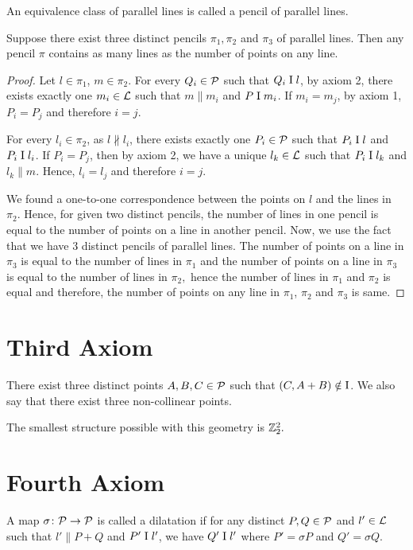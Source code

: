 \noindent
An equivalence class of parallel lines is called a pencil of parallel lines.

\begin{theorem} \label{thm:lines_num_pts}
    Suppose there exist three distinct pencils $\pi_1, \pi_2$ and $\pi_3$ of parallel lines. Then any pencil $\pi$ contains as many lines as the number of points on any line.
\end{theorem}
\begin{proof}
    Let $l \in \pi_1$, $m \in \pi_2$. For every $Q_i \in \mathcal{P}$ such that $Q_i \mathrel\text{I} l$, by axiom 2, there exists exactly one $m_i \in \mathcal{L}$ such that $m \parallel m_i$ and $P \mathrel\text{I} m_i$. If $m_i = m_j$, by axiom 1, $P_i=P_j$ and therefore $i=j$.
    \vspace{1ex}

    \noindent
    For every $l_i \in \pi_2$, as $l \nparallel l_i$, there exists exactly one $P_i \in \mathcal{P}$ such that $P_i \mathrel\text{I} l$ and $P_i \mathrel\text{I} l_i$. If $P_i = P_j$, then by axiom 2, we have a unique $l_k \in \mathcal{L}$ such that $P_i \mathrel\text{I} l_k$ and $l_k \parallel m$. Hence, $l_i=l_j$ and therefore $i=j$.

    We found a one-to-one correspondence between the points on $l$ and the lines in $\pi_2.$ Hence, for given two distinct pencils, the number of lines in one pencil is equal to the number of points on a line in another pencil. Now, we use the fact that we have 3 distinct pencils of parallel lines. The number of points on a line in $\pi_3$ is equal to the number of lines in $\pi_1$ and the number of points on a line in $\pi_3$ is equal to the number of lines in $\pi_2,$ hence the number of lines in $\pi_1$ and $\pi_2$ is equal and therefore, the number of points on any line in $\pi_1$, $\pi_2$ and $\pi_3$ is same.
\end{proof}

\section{Third Axiom}
\begin{axiom}[3]
    There exist three distinct points $A,B,C \in \mathcal{P}$ such that $(C,A+B) \notin \text{I}$. We also say that there exist three non-collinear points.
\end{axiom}

\noindent
The smallest structure possible with this geometry is $\mathbb{Z}_2^2.$

\section{Fourth Axiom}
\begin{definition}
    A map $\sigma\colon \mathcal{P} \to \mathcal{P}$ is called a dilatation if for any distinct $P,Q \in \mathcal{P}$ and $l' \in \mathcal{L}$ such that $l' \parallel P+Q$ and $P' \mathrel\text{I} l'$, we have $Q' \mathrel\text{I} l'$ where $P'=\sigma P$ and $Q'=\sigma Q$.
\end{definition}


